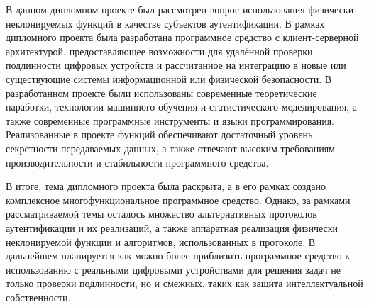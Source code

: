 \label{sec:outro}

В данном дипломном проекте был рассмотрен вопрос использования физически неклонируемых функций в качестве субъектов аутентификации. В рамках дипломного проекта была разработана программное средство с клиент-серверной архитектурой, предоставляющее возможности для удалённой проверки подлинности цифровых устройств и рассчитанное на интеграцию в новые или существующие системы информационной или физической безопасности. В разработанном проекте были использованы современные теоретические наработки, технологии машинного обучения и статистического моделирования, а также современные программные инструменты и языки программирования. Реализованные в проекте функций обеспечивают достаточный уровень секретности передаваемых данных, а также отвечают высоким требованиям производительности и стабильности программного средства.

В итоге, тема дипломного проекта была раскрыта, а в его рамках создано комплексное многофункциональное программное средство. Однако, за рамками рассматриваемой темы осталось множество альтернативных протоколов аутентификации и их реализаций, а также аппаратная реализация физически неклонируемой функции и алгоритмов, использованных в протоколе. В дальнейшем планируется как можно более приблизить программное средство к использованию с реальными цифровыми устройствами для решения задач не только проверки подлинности, но и смежных, таких как защита интеллектуальной собственности.
